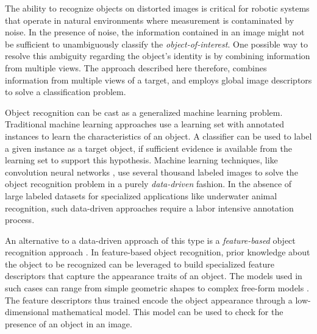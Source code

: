 \documentclass {udthesis}
\begin{document}
The ability to recognize objects on distorted images is critical for robotic systems that operate in natural environments where measurement is contaminated by noise. In the presence of noise, the information contained in an image might not be sufficient to unambiguously classify the \emph{object-of-interest}. 
One possible way to resolve this ambiguity regarding the object's identity is by combining information from multiple views. The approach described here therefore, combines information from multiple views of a target, and employs global image descriptors to solve a classification problem.

Object recognition can be cast as a generalized machine learning problem.
Traditional machine learning approaches \cite{alpaydin} use a learning set with annotated instances to learn the characteristics of an object. A classifier can be used to label a given instance as a target object, if sufficient evidence is available from the learning set to support this hypothesis. Machine learning techniques, like convolution neural networks \cite{cnn}, use several thousand labeled images to solve the object recognition problem in a purely \emph{data-driven} fashion. In the absence of large labeled datasets for specialized applications like underwater animal recognition, such data-driven approaches require a labor intensive annotation process.

An alternative to a data-driven approach of this type is a \emph{feature-based} object recognition approach \cite{roth}. In feature-based object recognition, prior knowledge about the object to be recognized can be leveraged to build specialized feature descriptors that capture the appearance traits of an object. The models used in such cases can range from simple geometric shapes to complex free-form models \cite{campbell, belongie}. The feature descriptors thus trained encode the object appearance through a low-dimensional mathematical model. This model can be used to check for the presence of an object in an image.
\end{document}
